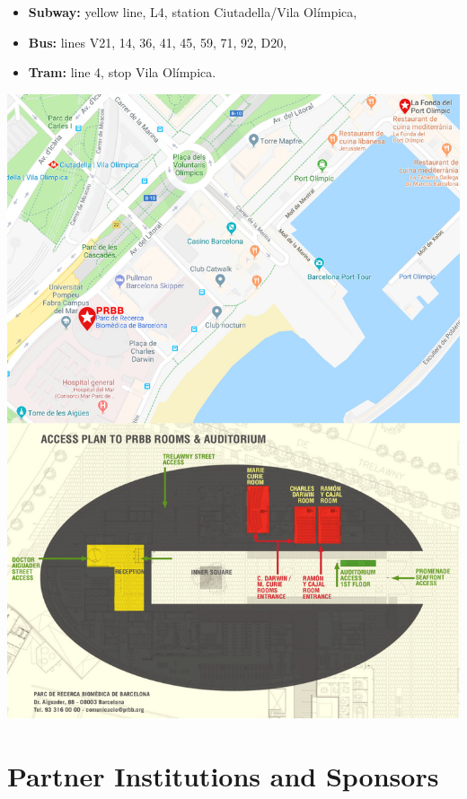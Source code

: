 \documentclass[openany, parskip=full, 12pt, a4]{scrbook}
\begin{document}
\begin{itemize}

	\item \textbf{Subway:} yellow line, L4, station Ciutadella/Vila Ol\'{i}mpica,
	\item \textbf{Bus:} lines V21, 14, 36, 41, 45, 59, 71, 92, D20,
	\item \textbf{Tram:} line 4, stop Vila Ol\'{i}mpica.
	
\end{itemize}

\begin{center}
\includegraphics[width=\linewidth]{images/amcos_map}
\end{center}


\chapter{Partner Institutions and Sponsors}




\newpage

\pagecolor{myblue}
\thispagestyle{empty}
\mbox{}
\end{document}
